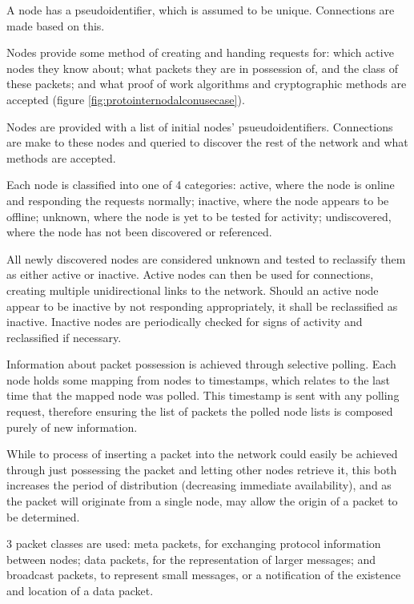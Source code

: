 
A node has a pseudoidentifier, which is assumed to be unique. Connections are made based on this.

Nodes provide some method of creating and handing requests for: which active nodes they know about; what packets they are in possession of, and the class of these packets; and what proof of work algorithms and cryptographic methods are accepted (figure \ref{fig:protointernodalconusecase}).

Nodes are provided with a list of initial nodes' psueudoidentifiers. Connections are make to these nodes and queried to discover the rest of the network and what methods are accepted.

Each node is classified into one of 4 categories: active, where the node is online and responding the requests normally; inactive, where the node appears to be offline; unknown, where the node is yet to be tested for activity; undiscovered, where the node has not been discovered or referenced.

All newly discovered nodes are considered unknown and tested to reclassify them as either active or inactive. Active nodes can then be used for connections, creating multiple unidirectional links to the network. Should an active node appear to be inactive by not responding appropriately, it shall be reclassified as inactive. Inactive nodes are periodically checked for signs of activity and reclassified if necessary. 

Information about packet possession is achieved through selective polling. Each node holds some mapping from nodes to timestamps, which relates to the last time that the mapped node was polled. This timestamp is sent with any polling request, therefore ensuring the list of packets the polled node lists is composed purely of new information. 

While to process of inserting a packet into the network could easily be achieved through just possessing the packet and letting other nodes retrieve it, this both increases the period of distribution (decreasing immediate availability), and as the packet will originate from a single node, may allow the origin of a packet to be determined.

3 packet classes are used: meta packets, for exchanging protocol information between nodes; data packets, for the representation of larger messages; and broadcast packets, to represent small messages, or a notification of the existence and location of a data packet.

